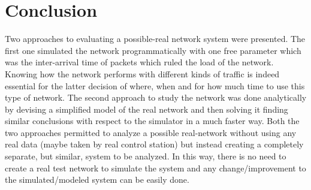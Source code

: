 \documentclass[conference]{IEEEtran}
\begin{document}
\section{Conclusion}\label{sec:conclusion}
Two approaches to evaluating a possible-real network system were presented. The first one simulated the network programmatically with one free parameter which was the inter-arrival time of packets which ruled the load of the network. Knowing how the network performs with different kinds of traffic is indeed essential for the latter decision of where, when and for how much time to use this type of network. The second approach to study the network was done analytically by devising a simplified model of the real network and then solving it finding similar conclusions with respect to the simulator in a much faster way. Both the two approaches permitted to analyze a possible real-network without using any real data (maybe taken by real control station) but instead creating a completely separate, but similar, system to be analyzed. In this way, there is no need to create a real test network to simulate the system and any change/improvement to the simulated/modeled system can be easily done.
\end{document}
